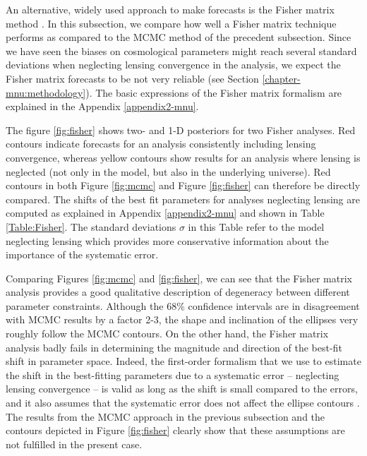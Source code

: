 An alternative, widely used approach to make forecasts is the Fisher matrix method \cite{Namikawa:2011yr,Duncan:2013haa,Camera:2014sba,Raccanelli:2015vla}. In this subsection, we compare how well a Fisher matrix technique performs as compared to the MCMC method of the precedent subsection. Since we have seen the biases on cosmological parameters might reach several standard deviations when neglecting lensing convergence in the analysis, we expect the Fisher matrix forecasts to be not very reliable (see Section \ref{chapter-mnu:methodology}). The basic expressions of the Fisher matrix formalism are explained in the Appendix \ref{appendix2-mnu}.
 
The figure \ref{fig:fisher} shows two- and 1-D posteriors for two Fisher analyses. Red contours indicate forecasts for an analysis consistently including lensing convergence, whereas yellow contours show results for an analysis where lensing is neglected (not only in the model, but also in the underlying universe). Red contours in both Figure \ref{fig:mcmc} and Figure \ref{fig:fisher} can therefore be directly compared. The shifts of the best fit parameters for analyses neglecting lensing are computed as explained in Appendix \ref{appendix2-mnu} and shown in Table \ref{Table:Fisher}. The standard deviations $\sigma$ in this Table refer to the model neglecting lensing which provides more conservative information about the importance of the systematic error. 

Comparing Figures \ref{fig:mcmc} and \ref{fig:fisher}, we can see that the Fisher matrix analysis provides a good qualitative description of degeneracy between different parameter constraints. Although the 68\% confidence intervals are in disagreement with MCMC results by a factor 2-3, the shape and inclination of the ellipses very roughly follow the MCMC contours. On the other hand, the Fisher matrix analysis badly fails in determining the magnitude and direction of the best-fit shift in parameter space. Indeed, the first-order formalism that we use to estimate the shift in the best-fitting parameters due to a systematic error -- neglecting lensing convergence -- is valid as long as the shift is small compared to the errors, and it also assumes that the systematic error does not affect the ellipse contours \cite{Kitching:2008eq}. The results from the MCMC approach in the previous subsection and the contours depicted in Figure \ref{fig:fisher} clearly show that these assumptions are not fulfilled in the present case.

